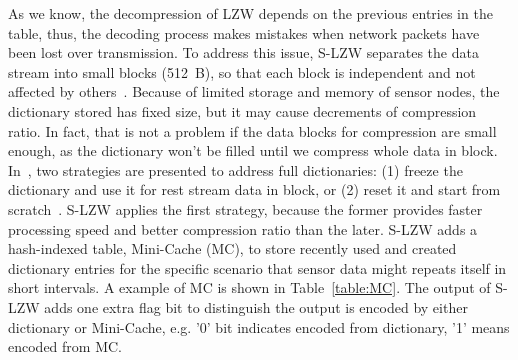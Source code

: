 As we know, the decompression of LZW depends on the previous entries in the
table, thus, the decoding process makes mistakes when network packets have been lost
over transmission. To address this issue, S-LZW separates the data stream into small
blocks (512~B), so that each block is independent and not affected by
others~\cite{sadler2006data}. Because of limited storage and memory of sensor
nodes, the dictionary stored has fixed size, but it may cause decrements of
compression ratio. In fact, that is not a problem if the data blocks for
compression are small enough, as the dictionary won't be filled until we compress
whole data in block. In~\cite{sadler2006data}, two strategies are presented to address
full dictionaries: (1) freeze the dictionary and use it for rest stream data in block,
or (2) reset it and start from scratch~\cite{sadler2006data}. S-LZW applies the first
strategy, because the former provides faster processing speed and better
compression ratio than the later. S-LZW adds a hash-indexed table,
Mini-Cache (MC), to store recently used and created dictionary entries for the
specific scenario that sensor data might repeats itself in short intervals. A
example of MC is shown in Table~\ref{table:MC}. The output of S-LZW adds one
extra flag bit to distinguish the output is encoded by either dictionary or
Mini-Cache, e.g. '0' bit indicates encoded from dictionary, '1' means encoded
from MC.
